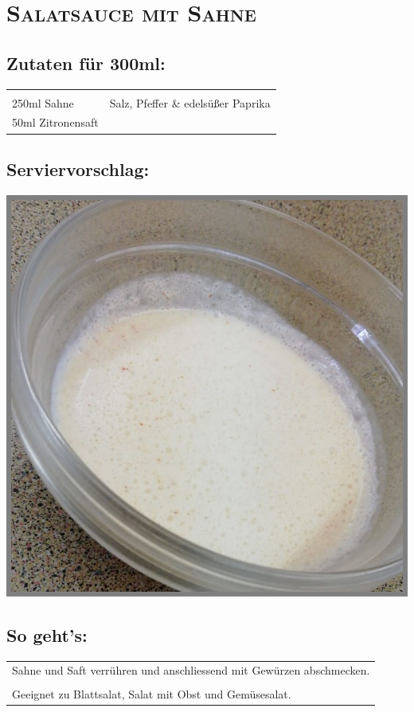 \section{\textsc{Salatsauce mit Sahne}}

\subsection*{Zutaten für 300ml:}

\begin{tabular}{p{7.5cm} p{7.5cm}}
	& \\
	250ml Sahne & Salz, Pfeffer \& edelsüßer Paprika \\
	50ml Zitronensaft & 
\end{tabular}

\subsection*{Serviervorschlag:}

\includegraphics[width=\textwidth]{img/d_sahne.jpeg} \cite{dsahne}

\subsection*{So geht's:}

\begin{tabular}{p{15cm}}
	\\
	Sahne und Saft verrühren und anschliessend mit Gewürzen abschmecken.\\
	\\
	Geeignet zu Blattsalat, Salat mit Obst und Gemüsesalat.
\end{tabular}
